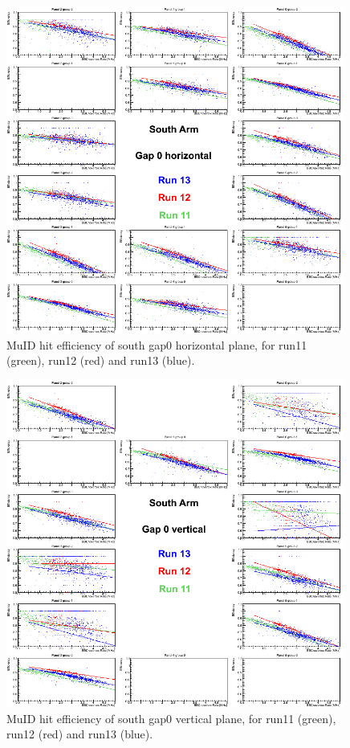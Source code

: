\begin{center}
  \begin{figure}[p]
    \includegraphics[width=0.99\textwidth]{./figures/efficomp_South_gap0_horizontal.png}
    \caption{\label{Fig:efficiency:MuIdEff:a0g0p0:app}MuID hit efficiency of south
    gap0 horizontal plane, for run11 (green), run12 (red) and run13 (blue).}
  \label{fig:muid_first_app}
\end{figure}
\end{center}
\begin{center}
  \begin{figure}[p]
    \includegraphics[width=0.99\textwidth]{./figures/efficomp_South_gap0_vertical.png}
    \caption{\label{Fig:efficiency:MuIdEff:a0g0p1}MuID hit efficiency of south gap0 vertical plane, for run11 (green), run12 (red) and run13 (blue).}
  \end{figure}
\end{center}
